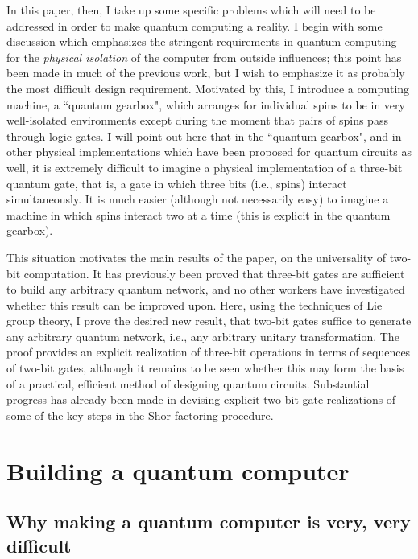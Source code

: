 In this paper, then, I take up some specific problems which will need to
be addressed in order to make quantum computing a reality.  I begin with some
discussion which emphasizes the stringent requirements in quantum
computing for the {\em physical isolation} of the computer from outside
influences; this point has been made  in much of the previous work, but
I wish to emphasize it as probably the most difficult design requirement.
Motivated by this, I introduce a computing machine, a ``quantum gearbox",
which arranges for individual spins to be in very well-isolated environments
except during the moment that pairs of spins pass through logic gates.
I will point out
here that in the ``quantum gearbox", and in other physical implementations
which have been proposed for quantum circuits as well, it is extremely
difficult to imagine a physical implementation of a three-bit quantum
gate, that is, a gate in which three bits (i.e., spins) interact
simultaneously.  It is much easier (although not necessarily easy) to
imagine a machine in which spins interact two at a time (this is explicit
in the quantum gearbox).

This situation motivates the main results of the paper, on the universality
of two-bit computation.  It has previously been proved that three-bit gates
are sufficient to build any arbitrary quantum network, and no other
workers have investigated whether this result can be improved upon.
Here, using the techniques of Lie group theory, I prove the desired new result,
that two-bit gates suffice to generate any arbitrary quantum network,
i.e., any arbitrary unitary transformation.  The proof provides an
explicit realization of three-bit operations in terms of sequences of
two-bit gates, although it remains to be seen whether this may form the basis
of
a practical, efficient method of designing quantum circuits.  Substantial
progress has already been made in devising explicit two-bit-gate
realizations of some of the key steps in the Shor factoring
procedure\cite{Copper}.

\section{Building a quantum computer}
\label{sec:two}

\subsection{Why making a quantum computer is very, very difficult}
\label{sec:vvd}

